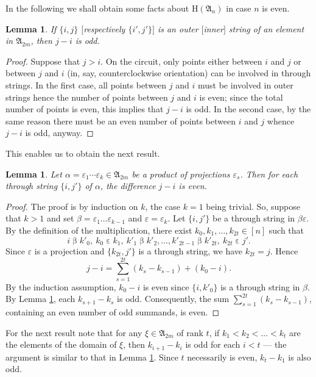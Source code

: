 \documentclass[preprint,1p,times]{elsarticle}
\numberwithin{equation}{section}
\newtheorem{Lemma}[Thm]{Lemma}
\theoremstyle{remark}
\def\al{\alpha}
\def\ep{\varepsilon}
\def\be{\beta}
\def\H{\mathrm H}
\def\A{\mathfrak{A}}
\begin{document}
In the following we shall obtain some facts about $\H(\A_n)$ in case $n$ is even.
\begin{Lemma}\label{differenceininnerstrings}
If $\{i,j\}$ $[$respectively $\{i',j'\}]$ is an outer $[$inner$]$ string of an element in $\A_{2m}$, then $j-i$ is odd.
\end{Lemma}
\begin{proof} Suppose that $j>i$. On the circuit, only points either between
$i$ and $j$ or between $j$ and $i$ (in, say, counterclockwise orientation) can be involved in through strings. In the
first case, all points between $j$ and $i$ must be involved in outer strings hence the number of points between $j$ and
$i$ is even; since the total number of points is even, this implies that $j-i$ is odd. In the second case, by the same
reason there must be an even number of points between $i$ and $j$ whence $j-i$ is odd, anyway.
\end{proof}

This enables us to obtain the next result.

\begin{Lemma}\label{differenceinthroughstrings}
Let $\al=\ep_1\cdots \ep_k\in\A_{2m}$ be a product of projections $\ep_s$. Then for each through string $\{i,j'\}$ of
$\al$, the difference $j-i$ is even.
\end{Lemma}

\begin{proof}
The proof is by induction on $k$, the case $k=1$ being trivial. So, suppose that $k>1$ and set
$\be=\ep_1\dots\ep_{k-1}$ and $\ep=\ep_k$. Let $\{i,j'\}$ be a through string in $\be\ep$. By the definition of the
multiplication, there exist $k_0,k_1,\dots,k_{2t}\in [n]$ such that
$$i\mathrel{\be}k'_0,\ k_0\mathrel{\ep} k_1,\ k'_1\mathrel{\be}
k'_2,\dots ,k'_{2t-1}\mathrel{\be}k'_{2t},\ k_{2t}\mathrel{\ep}j'.$$ Since $\ep$ is a projection and $\{k_{2t},j'\}$ is
a through string, we have $k_{2t}=j$. Hence
$$j-i=\sum_{s=1}^{2t}(k_s-k_{s-1})+(k_0-i).$$
By the induction assumption, $k_0-i$ is even since $\{i,k'_0\}$ is a through string in $\be$. By Lemma
\ref{differenceininnerstrings}, each $k_{s+1}-k_s$ is odd. Consequently, the sum $\sum_{s=1}^{2t}(k_{s}-k_{s-1})$,
containing an even number of odd summands, is even.
\end{proof}

For the next result note that for any $\xi\in\A_{2m}$ of rank $t$, if $k_1<k_2<\dots<k_t$ are the elements of the
domain of $\xi$, then $k_{i+1}-k_i$ is odd for each $i<t$ --- the argument is similar to that in Lemma
\ref{differenceininnerstrings}. Since $t$ necessarily is even, $k_t-k_1$ is also odd.
\end{document}
